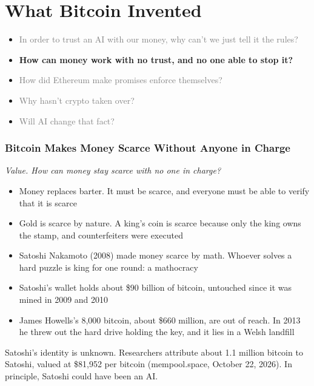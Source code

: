 \documentclass[aspectratio=169]{beamer}
\newcommand{\lead}[1]{{\small\itshape\textcolor{gtnavy!80}{#1}}\par\vspace{1.5mm}}
\newcommand{\bi}{\begin{itemize}}
\newcommand{\ei}{\end{itemize}}
\newcommand{\m}{\item}
\begin{document}
\section{What Bitcoin Invented}
\begin{frame}
\vfill
\begin{itemize}
\setlength{\itemsep}{3mm}
\item[] \textcolor{gray}{In order to trust an AI with our money, why can't we just tell it the rules?}
\item[\textcolor{gtnavy}{$\blacktriangleright$}] {\large\textcolor{gtnavy}{\textbf{How can money work with no trust, and no one able to stop it?}}}
\item[] \textcolor{gray}{How did Ethereum make promises enforce themselves?}
\item[] \textcolor{gray}{Why hasn't crypto taken over?}
\item[] \textcolor{gray}{\hspace*{8mm}Will AI change that fact?}
\end{itemize}
\vfill
\end{frame}


\begin{frame}[label=main-bitcoin]
\frametitle{Bitcoin Makes Money Scarce Without Anyone in Charge}
\lead{Value. How can money stay scarce with no one in charge?}

\bi
\m Money replaces barter. It must be scarce, and everyone must be able to verify that it is scarce
\m Gold is scarce by nature. A king's coin is scarce because only the king owns the stamp, and counterfeiters were executed
\m Satoshi Nakamoto (2008) made money scarce by math. Whoever solves a hard puzzle is king for one round: a mathocracy
\m Satoshi's wallet holds about \$90 billion of bitcoin, untouched since it was mined in 2009 and 2010
\m James Howells's 8,000 bitcoin, about \$660 million, are out of reach. In 2013 he threw out the hard drive holding the key, and it lies in a Welsh landfill
\ei
\vfill
{\scriptsize Satoshi's identity is unknown. Researchers attribute about 1.1 million bitcoin to Satoshi, valued at \$81,952 per bitcoin (mempool.space, October 22, 2026). In principle, Satoshi could have been an AI.}
\par\vspace{0pt plus 1fill}\hfill{\scriptsize \hyperlink{appx-copies}{}}
\end{frame}
\end{document}

